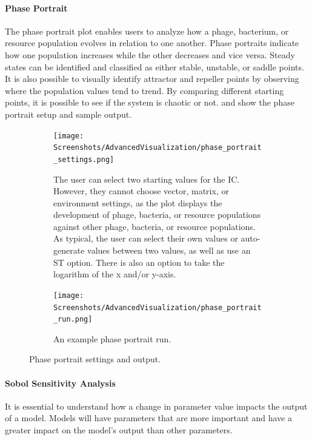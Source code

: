 \paragraph{Phase Portrait}
\label{sec:phase_portrait}
The phase portrait plot enables users to analyze how a phage, bacterium, or resource population evolves in relation to one another.
Phase portraits indicate how one population increases while the other decreases and vice versa.
Steady states can be identified and classified as either stable, unstable, or saddle points. 
It is also possible to visually identify attractor and repeller points by observing where the population values tend to trend. 
By comparing different starting points, it is possible to see if the system is chaotic or not.
 and  show the phase portrait setup and sample output. 

\begin{figure}[h!]
    \centering
    \begin{subfigure}{0.49\linewidth}
        \centering
        \captionsetup{width=1\linewidth}
        \texttt{[image: Screenshots/AdvancedVisualization/phase\_portrait\_settings.png]}
        \caption{
            The user can select two starting values for the IC. 
            However, they cannot choose vector, matrix, or environment settings, as the plot displays the development of phage, bacteria, or resource populations against other phage, bacteria, or resource populations.
            As typical, the user can select their own values or auto-generate values between two values, as well as use an ST option.
            There is also an option to take the logarithm of the x and/or y-axis. 
        }
        \label{fig:ss:av:phase_portrait_settings}
    \end{subfigure}
    \hfill
    \begin{subfigure}{0.49\linewidth}
        \centering
        \captionsetup{width=1\linewidth}
        \texttt{[image: Screenshots/AdvancedVisualization/phase\_portrait\_run.png]}
        \caption{
            An example phase portrait run. 
        }
        \label{fig:ss:av:phase_portrait_run}
    \end{subfigure}
    \caption{Phase portrait settings and output. }
\end{figure}

\paragraph{Sobol Sensitivity Analysis}
\label{sec:Sobol_sensitivity_analysis}
It is essential to understand how a change in parameter value impacts the output of a model. 
Models will have parameters that are more important and have a greater impact on the model's output than other parameters. 

